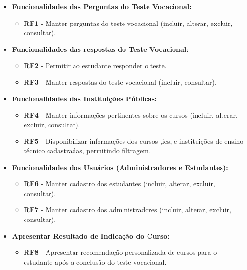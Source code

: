 \begin{itemize}
    \item \textbf{Funcionalidades das Perguntas do Teste Vocacional:}
    \begin{itemize}
        \item \textbf{RF1} - Manter perguntas do teste vocacional (incluir, alterar, excluir, consultar).
    \end{itemize}

    \item \textbf{Funcionalidades das respostas do Teste Vocacional:}
    \begin{itemize}
        \item \textbf{RF2} - Permitir ao estudante responder o teste.
        \item \textbf{RF3} - Manter respostas do teste vocacional (incluir, consultar).
    \end{itemize}

    \item \textbf{Funcionalidades das Instituições Públicas:}
    \begin{itemize}
        \item \textbf{RF4 }- Manter informações pertinentes sobre os cursos (incluir, alterar, excluir, consultar).
        \item \textbf{RF5} - Disponibilizar informações dos cursos ,\ac{ies}, e instituições de ensino técnico cadastradas, permitindo filtragem.
    \end{itemize}

    \item \textbf{Funcionalidades dos Usuários (Administradores e Estudantes):}
    \begin{itemize}
        \item \textbf{RF6} - Manter cadastro dos estudantes (incluir, alterar, excluir, consultar).
        \item \textbf{RF7} - Manter cadastro dos administradores (incluir, alterar, excluir, consultar).
    \end{itemize}

    \item \textbf{Apresentar Resultado de Indicação do Curso:}
    \begin{itemize}
        \item \textbf{RF8} - Apresentar recomendação personalizada de cursos para o estudante após a conclusão do teste vocacional.
    \end{itemize}
    
\end{itemize}

